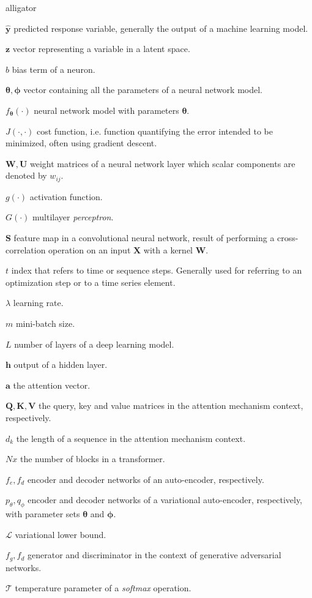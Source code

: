 \begin{labeling}{alligator}
	\item [$\mathbf{\hat{y}}$] predicted response variable, generally the output of a machine learning model.
	\item [$\mathbf{z}$] vector representing a variable in a latent space.
	\item [$b$] bias term of a neuron.
	\item [$\mathbf{\theta}, \mathbf{\phi}$] vector containing all the parameters of a neural network model.
	\item [$f_\mathbf{\theta}(\cdot)$] neural network model with parameters $\mathbf{\theta}$.
	\item [$J(\cdot, \cdot)$] cost function, i.e. function quantifying the error intended to be minimized, often using gradient descent.
	\item [$\mathbf{W}, \mathbf{U}$] weight matrices of a neural network layer which scalar components are denoted by $w_{ij}$.
	\item[$g(\cdot)$] activation function.
	\item[$G(\cdot)$] multilayer \textit{perceptron}.
	\item[$\mathbf{S}$] feature map in a convolutional neural network, result of performing a cross-correlation operation on an input $\mathbf{X}$ with a kernel $\mathbf{W}$.
	\item[$t$] index that refers to time or sequence steps. Generally used for referring to  an optimization step or to a time series element.
	\item[$\lambda$] learning rate.
	\item[$m$] mini-batch size.
	\item[$L$] number of layers of a deep learning model.
	\item[$\mathbf{h}$] output of a hidden layer.
	\item[$\mathbf{a}$] the attention vector.
	\item[$\mathbf{Q}, \mathbf{K}, \mathbf{V}$] the query, key and value matrices in the attention mechanism context, respectively.
	\item[$d_k$]{the length of a sequence in the attention mechanism context.}
	\item[$Nx$]{the number of blocks in a transformer.}
	\item[$f_e, f_d$]{encoder and decoder networks of an auto-encoder, respectively.}
	\item[$p_\theta, q_\phi$]{encoder and decoder networks of a variational auto-encoder, respectively, with parameter sets $\mathbf{\theta}$ and $\mathbf{\phi}$.}
	\item[$\mathcal{L}$]{variational lower bound.}
	\item[$f_g, f_d$]{generator and discriminator in the context of generative adversarial networks.}
	\item[$\mathcal{T}$] temperature parameter of a \textit{softmax} operation.
\end{labeling}

